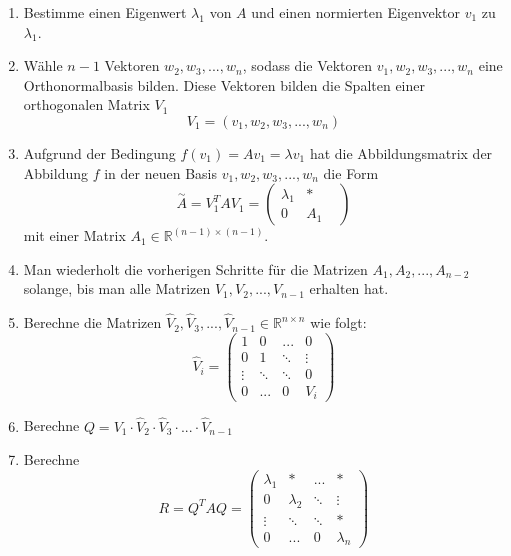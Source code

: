 \documentclass[a4paper,twocolumn,10pt]{article}
\begin{document}
\begin{enumerate}
\item Bestimme einen Eigenwert $\lambda_1$ von $A$ und einen normierten Eigenvektor $v_1$ zu $\lambda_1$.
\item Wähle $n-1$ Vektoren $w_2,w_3,...,w_n$, sodass die Vektoren $v_1,w_2,w_3,...,w_n$ eine Orthonormalbasis bilden. Diese Vektoren bilden die Spalten einer orthogonalen Matrix $V_1$
\begin{equation*}
V_1=(v_1,w_2,w_3,...,w_n)
\end{equation*}
\item Aufgrund der Bedingung $f(v_1)=Av_1=\lambda v_1$ hat die Abbildungsmatrix der Abbildung $f$ in der neuen Basis $v_1, w_2, w_3,...,w_n$ die Form
\begin{equation*}
\overset{\sim}{A}=V_1^TAV_1=\begin{pmatrix}\lambda_1 & * & \\ 0 & A_1\end{pmatrix}
\end{equation*}
mit einer Matrix $A_1\in\mathbb{R}^{(n-1)\times(n-1)}$.
\item Man wiederholt die vorherigen Schritte für die Matrizen $A_1,A_2,...,A_{n-2}$ solange, bis man alle Matrizen $V_1,V_2,...,V_{n-1}$ erhalten hat.
\item Berechne die Matrizen $\hat{V}_2,\hat{V}_3,...,\hat{V}_{n-1}\in\mathbb{R}^{n\times n}$ wie folgt:
\begin{equation*}
\hat{V}_i=\begin{pmatrix}1 & 0 & ... & 0 \\ 0 & 1 & \ddots & \vdots \\ \vdots & \ddots & \ddots & 0 \\ 0 & ... & 0 & V_i\end{pmatrix}
\end{equation*}
\item Berechne $Q=V_1\cdot\hat{V}_2\cdot\hat{V}_3\cdot ...\cdot \hat{V}_{n-1}$
\item Berechne
\begin{equation*}
R=Q^TAQ=\begin{pmatrix}\lambda_1 & * & ... & * \\ 0 & \lambda_2 & \ddots & \vdots \\ \vdots & \ddots & \ddots & * \\ 0 & ... & 0 & \lambda_n\end{pmatrix}
\end{equation*}
\end{enumerate}
\end{document}
